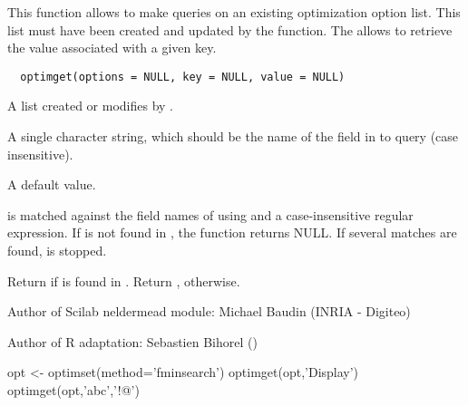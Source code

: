 %
\begin{Description}\relax
This function allows to make queries on an existing optimization option list.
This list must have been created and updated by the  function.
The  allows to retrieve the value associated with a given key.
\end{Description}
%
\begin{Usage}
\begin{verbatim}
  optimget(options = NULL, key = NULL, value = NULL)
\end{verbatim}
\end{Usage}
%
\begin{Arguments}
\begin{ldescription}
\item[\code{options}] A list created or modifies by .
\item[\code{key}] A single character string, which should be the name of the field in
 to query (case insensitive).
\item[\code{value}] A default value.
\end{ldescription}
\end{Arguments}
%
\begin{Details}\relax
{} is matched against the field names of  using
 and a case-insensitive regular expression. If  is not
found in , the function returns NULL. If several matches are
found,  is stopped.
\end{Details}
%
\begin{Value}
Return  if  is found in . Return
, otherwise.
\end{Value}
%
\begin{Author}\relax
Author of Scilab neldermead module: Michael Baudin (INRIA - Digiteo)

Author of R adaptation: Sebastien Bihorel ()
\end{Author}
%
\begin{SeeAlso}\relax
{}
\end{SeeAlso}
%
\begin{Examples}
\begin{ExampleCode}
  opt <- optimset(method='fminsearch')
  optimget(opt,'Display')
  optimget(opt,'abc','!@')
\end{ExampleCode}
\end{Examples}
